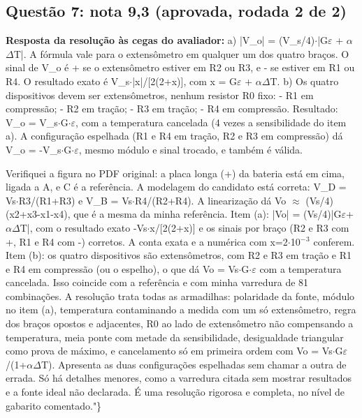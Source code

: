 \documentclass{article}%
\begin{document}
\subsection*{Questão 7: nota 9,3 (aprovada, rodada 2 de 2)}%
\textbf{Resposta da resolução às cegas do avaliador:} a) |V\_o| = (V\_s/4)$\cdot$|G$\varepsilon$ + $\alpha$$\Delta$T|. A fórmula vale para o extensômetro em qualquer um dos quatro braços. O sinal de V\_o é + se o extensômetro estiver em R2 ou R3, e - se estiver em R1 ou R4. O resultado exato é V\_s$\cdot$|x|/{[}2(2+x){]}, com x = G$\varepsilon$ + $\alpha$$\Delta$T.\newline%
\newline%
b) Os quatro dispositivos devem ser extensômetros, nenhum resistor R0 fixo:\newline%
{-} R1 em compressão;\newline%
{-} R2 em tração;\newline%
{-} R3 em tração;\newline%
{-} R4 em compressão.\newline%
\newline%
Resultado: V\_o = V\_s$\cdot$G$\cdot$$\varepsilon$, com a temperatura cancelada (4 vezes a sensibilidade do item a). A configuração espelhada (R1 e R4 em tração, R2 e R3 em compressão) dá V\_o = -V\_s$\cdot$G$\cdot$$\varepsilon$, mesmo módulo e sinal trocado, e também é válida.\par %
Verifiquei a figura no PDF original: a placa longa (+) da bateria está em cima, ligada a A, e C é a referência. A modelagem do candidato está correta: V\_D = Vs$\cdot$R3/(R1+R3) e V\_B = Vs$\cdot$R4/(R2+R4). A linearização dá Vo $\approx$ (Vs/4)(x2+x3-x1-x4), que é a mesma da minha referência. Item (a): |Vo| = (Vs/4)|G$\varepsilon$+$\alpha$$\Delta$T|, com o resultado exato -Vs$\cdot$x/{[}2(2+x){]} e os sinais por braço (R2 e R3 com +, R1 e R4 com -) corretos. A conta exata e a numérica com x=2$\cdot$10$^{-}$$^3$ conferem. Item (b): os quatro dispositivos são extensômetros, com R2 e R3 em tração e R1 e R4 em compressão (ou o espelho), o que dá Vo = Vs$\cdot$G$\cdot$$\varepsilon$ com a temperatura cancelada. Isso coincide com a referência e com minha varredura de 81 combinações. A resolução trata todas as armadilhas: polaridade da fonte, módulo no item (a), temperatura contaminando a medida com um só extensômetro, regra dos braços opostos e adjacentes, R0 ao lado de extensômetro não compensando a temperatura, meia ponte com metade da sensibilidade, desigualdade triangular como prova de máximo, e cancelamento só em primeira ordem com Vo = Vs$\cdot$G$\varepsilon$/(1+$\alpha$$\Delta$T). Apresenta as duas configurações espelhadas sem chamar a outra de errada. Só há detalhes menores, como a varredura citada sem mostrar resultados e a fonte ideal não declarada. É uma resolução rigorosa e completa, no nível de gabarito comentado."\}%
\end{document}
